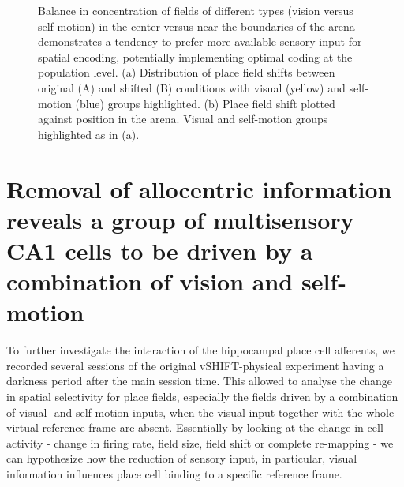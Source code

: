 \begin{figure}
\captionsetup{format=plain}
\caption[Balance between vision and self-motion]{
Balance in concentration of fields of different types (vision versus self-motion) in the center versus near the boundaries of the arena demonstrates a tendency to prefer more available sensory input for spatial encoding, potentially implementing optimal coding at the population level. (a) Distribution of place field shifts between original (A) and shifted (B) conditions with visual (yellow) and self-motion (blue) groups highlighted. (b) Place field shift plotted against position in the arena. Visual and self-motion groups highlighted as in (a).
}
\label{fig:F19_balance_field_concentration}
\end{figure}


\section[Multisensory cells driven by a combination of vision and self-motion]{Removal of allocentric information reveals a group of multisensory CA1 cells to be driven by a combination of vision and self-motion%
              }
\label{sec:multisensory_integration}

To further investigate the interaction of the hippocampal place cell afferents, we recorded several sessions of the original vSHIFT-physical experiment having a darkness period after the main session time. This allowed to analyse the change in spatial selectivity for place fields, especially the fields driven by a combination of visual- and self-motion inputs, when the visual input together with the whole virtual reference frame are absent. Essentially by looking at the change in cell activity - change in firing rate, field size, field shift or complete re-mapping - we can hypothesize how the reduction of sensory input, in particular, visual information influences place cell binding to a specific reference frame.

